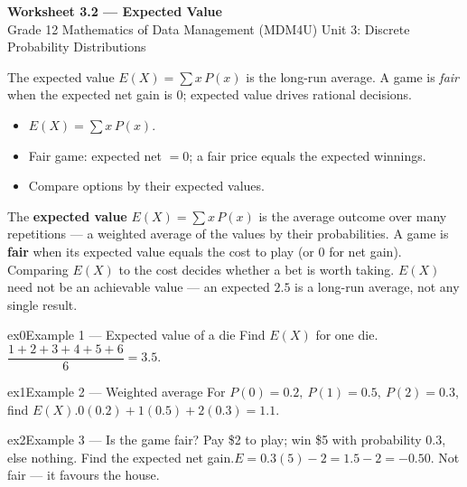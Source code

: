 \documentclass[11pt]{article}
\begin{document}
\begin{center}
{\LARGE\bfseries\color{titleblue}Worksheet 3.2 --- Expected Value}\\[2pt]
{\small Grade 12 Mathematics of Data Management (MDM4U) \textperiodcentered{} Unit 3: Discrete Probability Distributions}
\end{center}

\begin{ideabox}
The expected value $E(X)=\sum x\,P(x)$ is the long-run average. A game is \emph{fair} when the expected net gain is $0$; expected value drives rational decisions.
\begin{itemize}[leftmargin=*,itemsep=2pt]
  \item $E(X)=\sum x\,P(x)$.
  \item Fair game: expected net $=0$; a fair price equals the expected winnings.
  \item Compare options by their expected values.
\end{itemize}
\end{ideabox}

\begin{learnbox}
The \textbf{expected value} $E(X)=\sum x\,P(x)$ is the average outcome over many repetitions — a weighted average of the values by their probabilities.
A game is \textbf{fair} when its expected value equals the cost to play (or $0$ for net gain). Comparing $E(X)$ to the cost decides whether a bet is worth taking.
$E(X)$ need not be an achievable value — an expected $2.5$ is a long-run average, not any single result.
\end{learnbox}


\begin{example}{ex0}{Example 1 --- Expected value of a die}
Find $E(X)$ for one die.\soln $\dfrac{1+2+3+4+5+6}{6}=3.5$.
\end{example}

\begin{example}{ex1}{Example 2 --- Weighted average}
For $P(0)=0.2,\ P(1)=0.5,\ P(2)=0.3$, find $E(X)$.\soln $0(0.2)+1(0.5)+2(0.3)=1.1$.
\end{example}

\begin{example}{ex2}{Example 3 --- Is the game fair?}
Pay \$2 to play; win \$5 with probability $0.3$, else nothing. Find the expected net gain.\soln $E=0.3(5)-2=1.5-2=-0.50$. Not fair --- it favours the house.
\end{example}
\end{document}
